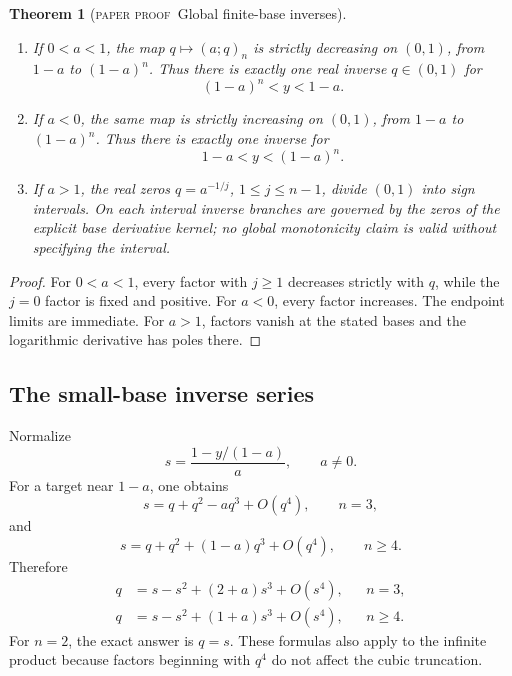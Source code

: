 \documentclass[11pt,oneside]{article}
\newtheorem{theorem}{Theorem}[section]
\theoremstyle{definition}
\theoremstyle{remark}
\theoremstyle{plain}
\theoremstyle{definition}
\theoremstyle{remark}
\newcommand{\statusproved}{\textcolor{provedgreen}{\textsc{paper proof}}}
\numberwithin{equation}{section}
\numberwithin{figure}{section}
\numberwithin{table}{section}
\let\reportsubsection\subsection
\let\reportsubsubsection\subsubsection
\let\section\reportsubsection
\let\subsection\reportsubsubsection
\begin{document}
\begin{theorem}[\statusproved\ Global finite-base inverses]
\begin{enumerate}[label=(\roman*)]
\item If \(0<a<1\), the map \(q\mapsto(a;q)_n\) is strictly decreasing on
\((0,1)\), from \(1-a\) to \((1-a)^n\).  Thus there is exactly one real inverse
\(q\in(0,1)\) for
\[
 (1-a)^n<y<1-a.
\]
\item If \(a<0\), the same map is strictly increasing on \((0,1)\), from
\(1-a\) to \((1-a)^n\).  Thus there is exactly one inverse for
\[
 1-a<y<(1-a)^n.
\]
\item If \(a>1\), the real zeros \(q=a^{-1/j}\), \(1\le j\le n-1\), divide
\((0,1)\) into sign intervals.  On each interval inverse branches are governed
by the zeros of the explicit base derivative kernel; no global monotonicity
claim is valid without specifying the interval.
\end{enumerate}
\end{theorem}
\begin{proof}
For \(0<a<1\), every factor with \(j\ge1\) decreases strictly with \(q\), while
the \(j=0\) factor is fixed and positive.  For \(a<0\), every factor increases.
The endpoint limits are immediate.  For \(a>1\), factors vanish at the stated
bases and the logarithmic derivative has poles there.
\end{proof}

\section{The small-base inverse series}
Normalize
\[
 s=\frac{1-y/(1-a)}{a},
 \qquad a\ne0.
\]
For a target near \(1-a\), one obtains
\[
 s=q+q^2-aq^3+O(q^4),\qquad n=3,
\]
and
\[
 s=q+q^2+(1-a)q^3+O(q^4),\qquad n\ge4.
\]
Therefore
\begin{align}
 q&=s-s^2+(2+a)s^3+O(s^4),&&n=3,\label{eq:qinv-small-n3}\\
 q&=s-s^2+(1+a)s^3+O(s^4),&&n\ge4.\label{eq:qinv-small-n4}
\end{align}
For \(n=2\), the exact answer is \(q=s\).  These formulas also apply to the
infinite product because factors beginning with \(q^4\) do not affect the
cubic truncation.
\end{document}
